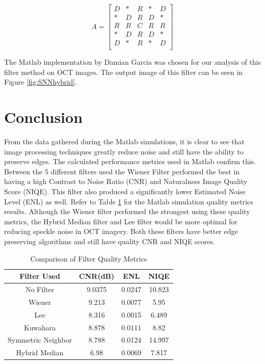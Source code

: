 \documentclass[%
reprint,
showpacs,preprintnumbers,
bibnotes,
amsmath,amssymb,
aps,
pra,
]{revtex4-1}
\begin{document}
$$
A =
\begin{bmatrix}
D & * & R & * & D\\
* & D & R & D & *\\
R & R & C & R & R\\
* & D & R & D & *\\
D & * & R & * & D\\
\end{bmatrix}
$$



The Matlab implementation by Damian Garcia was chosen for our analysis of this filter method on OCT images\cite{garcia_hybrid_2010}. The output image of this filter can be seen in Figure \ref{fig:SNNhybrid}.
\section{\label{sec:level1} Conclusion}
From the data gathered during the Matlab simulations, it is clear to see that image processing techniques greatly reduce noise and still have the ability to preserve edges. The calculated performance metrics used in Matlab confirm this. Between the 5 different filters used the Wiener Filter performed the best in having a high Contrast to Noise Ratio (CNR) and Naturalness Image Quality Score (NIQE). This filter also produced a significantly lower Estimated Noise Level (ENL) as well. Refer to Table \ref{tab:compare} for the Matlab simulation quality metrics results. Although the Wiener filter performed the strongest using these quality metrics, the Hybrid Median filter and Lee filter would be more optimal for reducing speckle noise in OCT imagery. Both these filters have better edge preserving algorithms and still have quality CNR and NIQE scores.

\begin{table}[]
  \begin{tabular}{|c|c|c|c|}
    \hline
    Filter Used & CNR(dB) & ENL & NIQE \\
    \hline
    No Filter & 9.0375 & 0.0247 & 10.823  \\
    \hline
    Wiener & 9.213 & 0.0077 & 5.95 \\
    \hline
    Lee & 8.316 & 0.0015 & 6.489 \\
    \hline
    Kuwahara & 8.878 & 0.0111 & 8.82 \\
    \hline
    Symmetric Neighbor & 8.788 & 0.0124 & 14.997\\
    \hline
    Hybrid Median  & 6.98 & 0.0069 & 7.817 \\
    \hline
  \end{tabular}
  \caption{Comparison of Filter Quality Metrics}
  \label{tab:compare}
\end{table}
\end{document}
